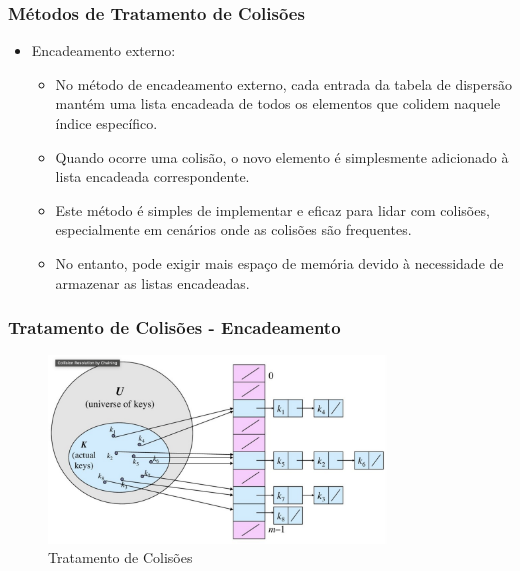 
\begin{frame}[fragile]
  \frametitle{Métodos de Tratamento de Colisões}
  \begin{itemize}
    \item Encadeamento externo:
      \begin{itemize}
        \item No método de encadeamento externo, cada entrada da tabela de dispersão mantém uma lista encadeada de todos os elementos que colidem naquele índice específico.
        \item Quando ocorre uma colisão, o novo elemento é simplesmente adicionado à lista encadeada correspondente.
        \item Este método é simples de implementar e eficaz para lidar com colisões, especialmente em cenários onde as colisões são frequentes.
        \item No entanto, pode exigir mais espaço de memória devido à necessidade de armazenar as listas encadeadas.
      \end{itemize}
  \end{itemize}
\end{frame}

\begin{frame}[fragile]
  \frametitle{Tratamento de Colisões - Encadeamento}
  \begin{figure}
    \centering
    \includegraphics[width=0.8\textwidth]{aulas/aula2-hash-fig3.png}
    \caption{Tratamento de Colisões}
  \end{figure}
\end{frame}



